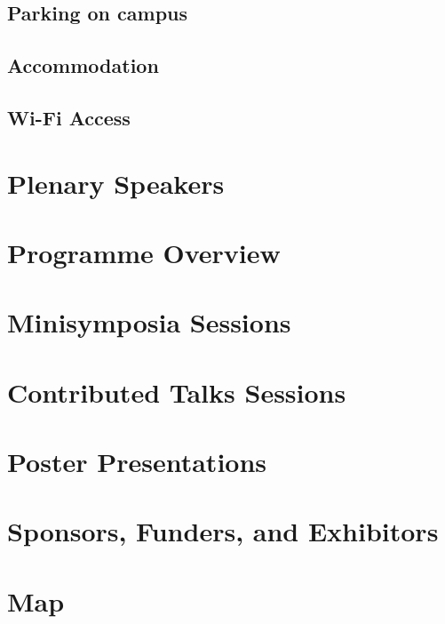 \documentclass[12pt,a4paper]{article}
\begin{document}
\subsection{Parking on campus}

\subsection{Accommodation}

\subsection{Wi-Fi Access}

\section{Plenary Speakers}

\section{Programme Overview}

\section{Minisymposia Sessions}



\section{Contributed Talks Sessions}



\section{Poster Presentations}

{\footnotesize\raggedright}

\section{Sponsors, Funders, and Exhibitors}

\section{Map}
\end{document}
